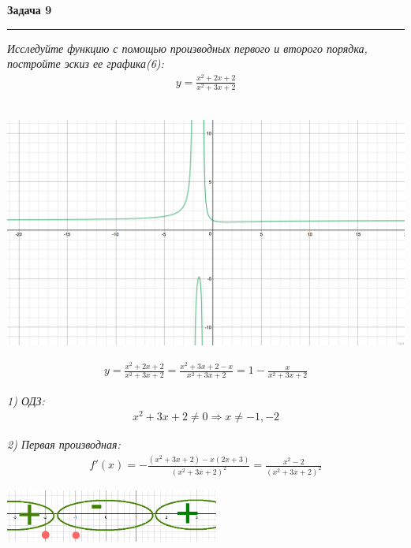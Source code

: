 \documentclass[a4paper,11pt]{article}
\begin{document}










\textbf{\large Задача 9}
\medskip\hrule\medskip
\textsl{Исследуйте функцию с помощью производных первого и второго порядка, постройте эскиз ее графика(6):}
\begin{align*}
y = \frac{x^2 + 2x + 2}{x^2 + 3x + 2}
\end{align*} \\

\begin{center}
	\includegraphics[width = 150mm]{images/91.png}
\end{center}

\begin{gather*}
	y = \frac{x^2 + 2x + 2}{x^2 + 3x + 2} = \frac{x^2 + 3x + 2 - x}{x^2 + 3x + 2} = 1 - \frac{x}{x^2 + 3x + 2}
\end{gather*}

\noindent \textsl{1) ОДЗ:}
\begin{gather*}
x^2 + 3x + 2 \neq 0 \Rightarrow x \neq -1, -2
\end{gather*}

\noindent  \textsl{2) Первая производная:}
\begin{gather*}
f'(x) = -\frac{(x^2 + 3x + 2) - x(2x + 3)}{(x^2 + 3x + 2)^2} = \frac{x^2 - 2}{(x^2 + 3x + 2)^2}
\end{gather*} 
\begin{center}
	\includegraphics[width = 70mm]{images/92.png}
\end{center}
\end{document}

